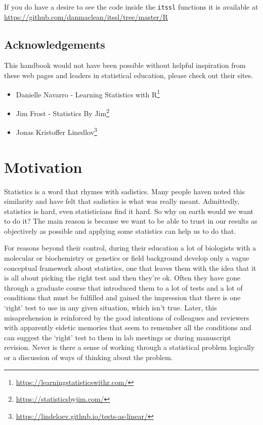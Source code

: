 \documentclass[
]{book}
\providecommand{\tightlist}{%
  \setlength{\itemsep}{0pt}\setlength{\parskip}{0pt}}
\renewcommand{\href}[2]{#2\footnote{\url{#1}}}
\begin{document}
If you do have a desire to see the code inside the \texttt{itssl} functions it is available at \url{https://github.com/danmaclean/itssl/tree/master/R}

\hypertarget{acknowledgements}{%
\section{Acknowledgements}\label{acknowledgements}}

This handbook would not have been possible without helpful inspiration from these web pages and leaders in statistical education, please check out their sites.

\begin{itemize}
\tightlist
\item
  \href{https://learningstatisticswithr.com/}{Danielle Navarro - Learning Statistics with R}
\item
  \href{https://statisticsbyjim.com/}{Jim Frost - Statistics By Jim}
\item
  \href{https://lindeloev.github.io/tests-as-linear/}{Jonas Kristoffer Linedlov}
\end{itemize}

\hypertarget{motivation}{%
\chapter{Motivation}\label{motivation}}

Statistics is a word that rhymes with sadistics. Many people haven noted this similarity and have felt that sadistics is what was really meant. Admittedly, statistics is hard, even statisticians find it hard. So why on earth would we want to do it? The main reason is because we want to be able to trust in our results as objectively as possible and applying some statistics can help us to do that.

For reasons beyond their control, during their education a lot of biologists with a molecular or biochemistry or genetics or field background develop only a vague conceptual framework about statistics, one that leaves them with the idea that it is all about picking the right test and then they're ok. Often they have gone through a graduate course that introduced them to a lot of tests and a lot of conditions that must be fulfilled and gained the impression that there is one `right' test to use in any given situation, which isn't true. Later, this misaprehension is reinforced by the good intentions of colleagues and reviewers with apparently eidetic memories that seem to remember all the conditions and can suggest the `right' test to them in lab meetings or during manuscript revision. Never is there a sense of working through a statistical problem logically or a discussion of ways of thinking about the problem.
\end{document}
